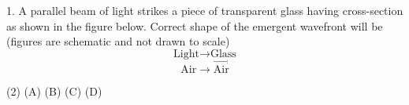  1. A parallel beam of light strikes a piece of transparent glass having cross-section as shown in the figure below. Correct shape of the emergent wavefront will be (figures are schematic and not drawn to scale)
$$\text{Light}\rightarrow\text{Glass}$$
$$\text{Air}\rightarrow\overrightarrow{\text{Air}}$$

\begin{tasks}(2)
\ask (A)
\ask (B)
\ask (C)
\ask (D)
\end{tasks}